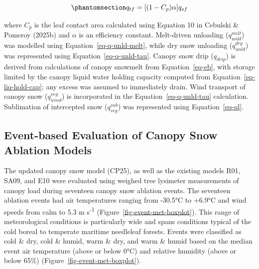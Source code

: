 \documentclass[
  letterpaper,
]{tex/uofsthesis-cs}
\begin{document}
\begin{equation}\phantomsection\label{eq-qtf}{
q_{tf} = [(1 - C_p)  \alpha] q_{sf}
}\end{equation}

where \(C_p\) is the leaf contact area calculated using Equation 10 in
Cebulski \& Pomeroy (2025b) and \(\alpha\) is an efficiency constant.
Melt-driven unloading (\(q_{unld}^{melt}\)) was modelled using
Equation~\ref{eq-q-unld-melt}, while dry snow unloading
(\(q_{unld}^{dry}\)) was represented using Equation~\ref{eq-q-unld-tau}.
Canopy snow drip (\(q_{drip}\)) is derived from calculations of canopy
snowmelt from Equation~\ref{eq-eb}, with storage limited by the canopy
liquid water holding capacity computed from
Equation~\ref{eq-liq-hold-cap}; any excess was assumed to immediately
drain. Wind transport of canopy snow (\(q_{wind}^{veg}\)) is
incorporated in the Equation~\ref{eq-q-unld-tau} calculation.
Sublimation of intercepted snow (\(q_{veg}^{sub}\)) was represented
using Equation~\ref{eq-ql}.

\subsection{Event-based Evaluation of Canopy Snow Ablation
Models}\label{event-based-evaluation-of-canopy-snow-ablation-models}

The updated canopy snow model (CP25), as well as the existing models
R01, SA09, and E10 were evaluated using weighed tree lysimeter
measurements of canopy load during seventeen canopy snow ablation
events. The seventeen ablation events had air temperatures ranging from
-30.5°C to +6.9°C and wind speeds from calm to 5.3 m
s\textsuperscript{-1} (Figure~\ref{fig-event-met-boxplot}). This range
of meteorological conditions is particularly wide and spans conditions
typical of the cold boreal to temperate maritime needleleaf forests.
Events were classified as cold \& dry, cold \& humid, warm \& dry, and
warm \& humid based on the median event air temperature (above or below
0°C) and relative humidity (above or below 65\%)
(Figure~\ref{fig-event-met-boxplot}).
\end{document}
